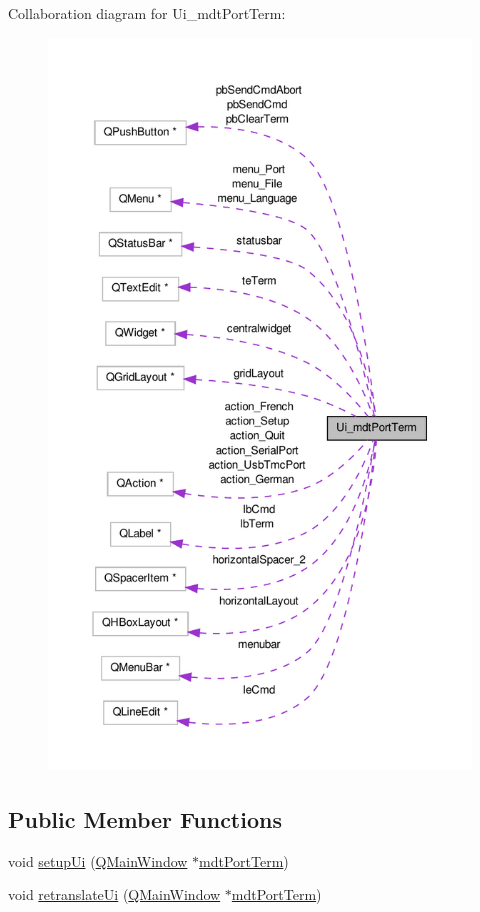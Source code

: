 Collaboration diagram for Ui\-\_\-mdt\-Port\-Term\-:\nopagebreak
\begin{figure}[H]
\begin{center}
\leavevmode
\includegraphics[height=550pt]{class_ui__mdt_port_term__coll__graph}
\end{center}
\end{figure}
\subsection*{Public Member Functions}
\begin{DoxyCompactItemize}
\item 
void \hyperlink{class_ui__mdt_port_term_ae97b4a5882faae258e43fc924af070bc}{setup\-Ui} (\hyperlink{class_q_main_window}{Q\-Main\-Window} $\ast$\hyperlink{classmdt_port_term}{mdt\-Port\-Term})
\item 
void \hyperlink{class_ui__mdt_port_term_a3dd5088c741ecb0fb01d2952e6f9c8a7}{retranslate\-Ui} (\hyperlink{class_q_main_window}{Q\-Main\-Window} $\ast$\hyperlink{classmdt_port_term}{mdt\-Port\-Term})
\end{DoxyCompactItemize}
